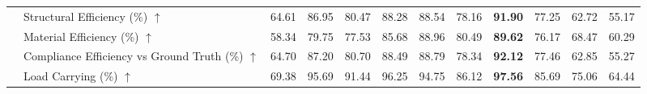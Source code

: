 \begin{table}[!h]
{\begin{tabular}{llllllllllll}
 & Structural Efficiency (\%) $\uparrow$ & 64.61 & 86.95 & 80.47 & 88.28 & 88.54 & 78.16 & \textbf{91.90} & 77.25 & 62.72 & 55.17 \\
 & Material Efficiency (\%) $\uparrow$ & 58.34 & 79.75 & 77.53 & 85.68 & 88.96 & 80.49 & \textbf{89.62} & 76.17 & 68.47 & 60.29 \\
 & Compliance Efficiency vs Ground Truth (\%) $\uparrow$ & 64.70 & 87.20 & 80.70 & 88.49 & 88.79 & 78.34 & \textbf{92.12} & 77.46 & 62.85 & 55.27 \\
 & Load Carrying (\%) $\uparrow$ & 69.38 & 95.69 & 91.44 & 96.25 & 94.75 & 86.12 & \textbf{97.56} & 85.69 & 75.06 & 64.44 \\
    \bottomrule
  \end{tabular}
  }
\end{table}